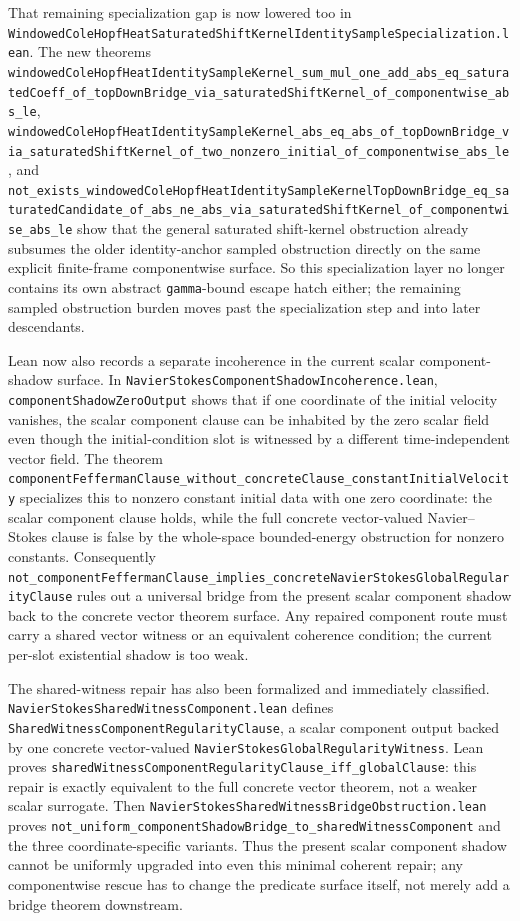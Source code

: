 \documentclass[11pt]{article}
\theoremstyle{remark}
\begin{document}
That remaining specialization gap is now lowered too in
\texttt{WindowedColeHopfHeatSaturatedShiftKernelIdentitySampleSpecialization.lean}.
The new theorems
\texttt{windowedColeHopfHeatIdentitySampleKernel\_sum\_mul\_one\_add\_abs\_eq\_saturatedCoeff\_of\_topDownBridge\_via\_saturatedShiftKernel\_of\_componentwise\_abs\_le},
\texttt{windowedColeHopfHeatIdentitySampleKernel\_abs\_eq\_abs\_of\_topDownBridge\_via\_saturatedShiftKernel\_of\_two\_nonzero\_initial\_of\_componentwise\_abs\_le},
and
\texttt{not\_exists\_windowedColeHopfHeatIdentitySampleKernelTopDownBridge\_eq\_saturatedCandidate\_of\_abs\_ne\_abs\_via\_saturatedShiftKernel\_of\_componentwise\_abs\_le}
show that the general saturated shift-kernel obstruction already subsumes the
older identity-anchor sampled obstruction directly on the same explicit
finite-frame componentwise surface.  So this specialization layer no longer
contains its own abstract \texttt{gamma}-bound escape hatch either; the
remaining sampled obstruction burden moves past the specialization step and
into later descendants.

Lean now also records a separate incoherence in the current scalar
component-shadow surface.  In
\texttt{NavierStokesComponentShadowIncoherence.lean},
\texttt{componentShadowZeroOutput} shows that if one coordinate of the initial
velocity vanishes, the scalar component clause can be inhabited by the zero
scalar field even though the initial-condition slot is witnessed by a different
time-independent vector field.  The theorem
\texttt{componentFeffermanClause\_without\_concreteClause\_constantInitialVelocity}
specializes this to nonzero constant initial data with one zero coordinate:
the scalar component clause holds, while the full concrete vector-valued
Navier--Stokes clause is false by the whole-space bounded-energy obstruction
for nonzero constants.  Consequently
\texttt{not\_componentFeffermanClause\_implies\_concreteNavierStokesGlobalRegularityClause}
rules out a universal bridge from the present scalar component shadow back to
the concrete vector theorem surface.  Any repaired component route must carry a
shared vector witness or an equivalent coherence condition; the current
per-slot existential shadow is too weak.

The shared-witness repair has also been formalized and immediately classified.
\texttt{NavierStokesSharedWitnessComponent.lean} defines
\texttt{SharedWitnessComponentRegularityClause}, a scalar component output
backed by one concrete vector-valued
\texttt{NavierStokesGlobalRegularityWitness}.  Lean proves
\texttt{sharedWitnessComponentRegularityClause\_iff\_globalClause}: this repair
is exactly equivalent to the full concrete vector theorem, not a weaker scalar
surrogate.  Then
\texttt{NavierStokesSharedWitnessBridgeObstruction.lean} proves
\texttt{not\_uniform\_componentShadowBridge\_to\_sharedWitnessComponent} and
the three coordinate-specific variants.  Thus the present scalar component
shadow cannot be uniformly upgraded into even this minimal coherent repair; any
componentwise rescue has to change the predicate surface itself, not merely add
a bridge theorem downstream.
\end{document}
